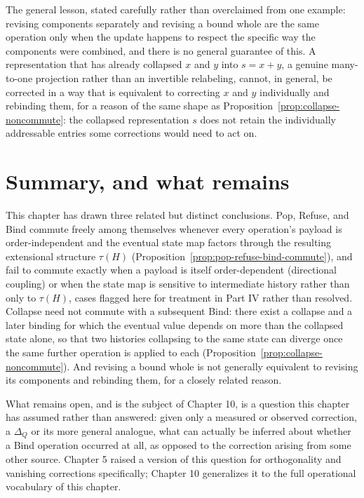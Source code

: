 \documentclass[11pt]{book}
\begin{document}
The general lesson, stated carefully rather than overclaimed from one example: revising components separately and revising a bound whole are the same operation only when the update happens to respect the specific way the components were combined, and there is no general guarantee of this. A representation that has already collapsed $x$ and $y$ into $s=x+y$, a genuine many-to-one projection rather than an invertible relabeling, cannot, in general, be corrected in a way that is equivalent to correcting $x$ and $y$ individually and rebinding them, for a reason of the same shape as Proposition~\ref{prop:collapse-noncommute}: the collapsed representation $s$ does not retain the individually addressable entries some corrections would need to act on.

\section{Summary, and what remains}

This chapter has drawn three related but distinct conclusions. Pop, Refuse, and Bind commute freely among themselves whenever every operation's payload is order-independent and the eventual state map factors through the resulting extensional structure $\tau(H)$ (Proposition~\ref{prop:pop-refuse-bind-commute}), and fail to commute exactly when a payload is itself order-dependent (directional coupling) or when the state map is sensitive to intermediate history rather than only to $\tau(H)$, cases flagged here for treatment in Part IV rather than resolved. Collapse need not commute with a subsequent Bind: there exist a collapse and a later binding for which the eventual value depends on more than the collapsed state alone, so that two histories collapsing to the same state can diverge once the same further operation is applied to each (Proposition~\ref{prop:collapse-noncommute}). And revising a bound whole is not generally equivalent to revising its components and rebinding them, for a closely related reason.

What remains open, and is the subject of Chapter 10, is a question this chapter has assumed rather than answered: given only a measured or observed correction, a $\Delta_Q$ or its more general analogue, what can actually be inferred about whether a Bind operation occurred at all, as opposed to the correction arising from some other source. Chapter 5 raised a version of this question for orthogonality and vanishing corrections specifically; Chapter 10 generalizes it to the full operational vocabulary of this chapter.
\end{document}
